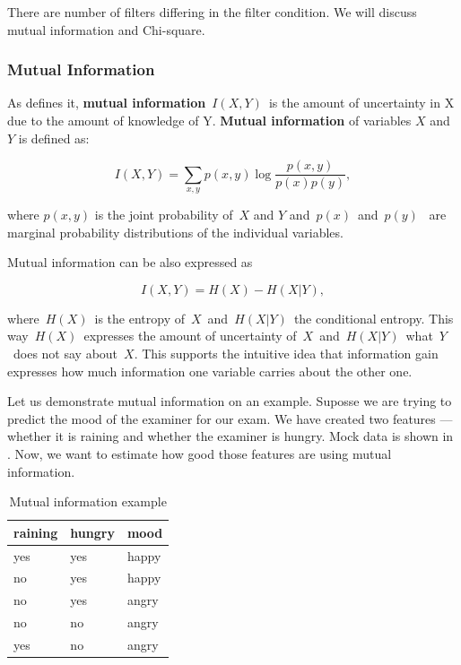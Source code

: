 There are number of filters differing in the filter condition.
We will discuss mutual information and Chi-square.

\subsubsection{Mutual Information}\label{subsubsec:mi}

As \citet{Hoq14} defines it,
{\bf mutual information}~$I(X, Y)$~is the amount of uncertainty in X due to the amount of knowledge of Y.
{\bf Mutual information} of variables $X$ and $Y$ is defined as:

\begin{equation}
I(X,Y) = \sum_{x,y} p\left(x,y\right)
\log
\frac{p\left(x,y\right)}{p\left(x\right)p\left(y\right)},
\label{eq:mi}
\end{equation}

where $p\left(x, y\right)$ is the joint probability of~$X$ and $Y$ and~$p(x)$~and~$p(y)$~
are marginal probability distributions of the individual variables.

Mutual information can be also expressed as

\begin{equation}
	I(X, Y) = H(X) - H(X|Y),
\end{equation}


where~$H(X)$~is the entropy of~$X$~and~$H(X|Y)$~the conditional entropy.
This way~$H(X)$~expresses the amount of uncertainty of~$X$~and~$H(X|Y)$~what~$Y$~does not say about~$X$.
This supports the intuitive idea that information gain expresses how much information one variable carries about the other one.

Let us demonstrate mutual information on an example.
Suposse we are trying to predict the mood of the examiner for our exam.
We have created two features --- whether it is raining and whether the examiner is hungry.
Mock data is shown in .
Now, we want to estimate how good those features are using mutual information.


\begin{table}[h!]
 \center
 \begin{tabular}{lll}
	\toprule
	 \textbf{raining} & \textbf{hungry} & \textbf{mood} \\ 
	 \midrule
	 yes & yes & happy \\
	 no & yes & happy \\
	 no & yes & angry \\
	 no & no & angry \\
	 yes  & no & angry \\
	 \bottomrule
 \end{tabular}
 \caption{Mutual information example}
 \label{tab:mi_ex}
\end{table}

